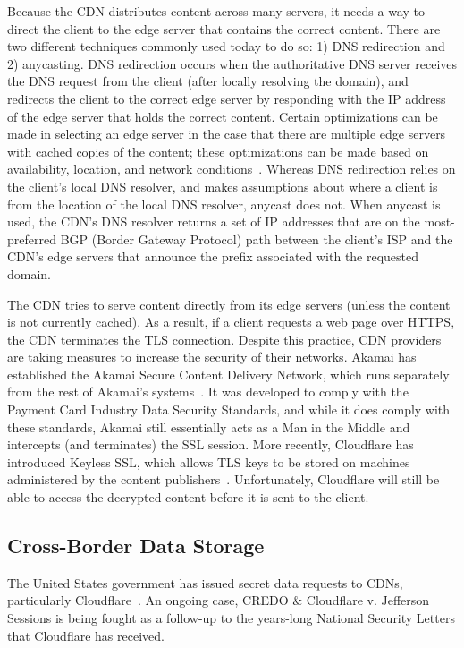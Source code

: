 Because the CDN distributes content across many servers, it needs a way to direct the client 
to the edge server that contains the correct content.  There are two different techniques commonly used 
today to do so: 1) DNS redirection and 2) anycasting. DNS redirection occurs when the authoritative DNS 
server receives the DNS request from the client (after locally resolving the domain), and redirects the client 
to the correct edge server by responding with the IP address of the edge server that holds the correct content. Certain 
optimizations can be made in selecting an edge server in the case that there are multiple edge servers 
with cached copies of the content; these optimizations can be made based on availability, location, and 
network conditions~\cite{krishnamurthy2001use}.  Whereas DNS redirection relies on the client's local DNS 
resolver, and makes assumptions about where a client is from the location of the local DNS resolver, 
anycast does not.  When anycast is used, the CDN's DNS resolver returns a set of IP addresses that 
are on the most-preferred BGP (Border Gateway Protocol) path between the client's ISP and the CDN's 
edge servers that announce the prefix associated with the requested domain.

The CDN tries to serve content directly from its edge servers (unless the content is not currently 
cached).  As a result, if a client requests a web page over HTTPS, the CDN terminates the TLS 
connection.  Despite this practice, CDN providers are taking measures to increase the security of 
their networks.  Akamai has established the Akamai Secure Content Delivery Network, which runs separately 
from the rest of Akamai's systems~\cite{akamai_ssl}.  It was developed to comply with the Payment Card Industry Data
Security Standards, and while it does comply with these standards, Akamai still essentially acts as a 
Man in the Middle and intercepts (and terminates) the SSL session.  More recently, Cloudflare has 
introduced Keyless SSL, which allows TLS keys to be stored on machines administered by the content 
publishers~\cite{cloudflare_keyless}.  Unfortunately, Cloudflare will still be able to access the decrypted 
content before it is sent to the client.

\subsection{Cross-Border Data Storage}
\label{sec:legal}
The United States government has issued secret 
data requests to CDNs, particularly Cloudflare~\cite{cloudflare_nsl}.  An ongoing case, CREDO \& Cloudflare v. 
Jefferson Sessions is being fought as a follow-up to the years-long National Security Letters that 
Cloudflare has received.  

